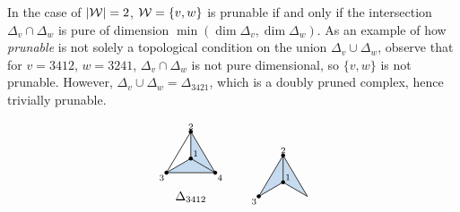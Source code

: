 \begin{example}
In the case of $|\mathcal{W}| = 2$, $\mathcal{W} = \{v,w\}$ is prunable if and only if the intersection $\Delta_v\cap \Delta_w$ is pure of dimension $\min(\dim\Delta_v,\dim\Delta_w)$. As an example of how \emph{prunable} is not solely a topological condition on the union $\Delta_v\cup \Delta_w$, observe that for $v = 3412$, $w=3241$, $\Delta_v\cap\Delta_w$ is not pure dimensional, so $\{v,w\}$ is not prunable. However, $\Delta_v\cup \Delta_w = \Delta_{3421}$, which is a doubly pruned complex, hence trivially prunable.

\[
\begin{tikzpicture}[scale=0.56, x=1cm, y=1cm,
  vtx/.style={circle, fill=black, inner sep=1.15pt},
  ghost/.style={circle, draw=black!30, fill=white, inner sep=1.0pt},
  ed/.style={line width=0.7pt, black!80}]
  \coordinate (v2) at (0.000,1.300);
  \coordinate (v3) at (-1.220,-0.780);
  \coordinate (v4) at (1.220,-0.780);
  \coordinate (v1) at (0.000,-0.060);
  \fill[faceblue] (v1) -- (v2) -- (v4) -- cycle;
  \fill[faceblue] (v1) -- (v3) -- (v4) -- cycle;
  \draw[ed] (v1) -- (v2);
  \draw[ed] (v1) -- (v3);
  \draw[ed] (v1) -- (v4);
  \draw[ed] (v2) -- (v3);
  \draw[ed] (v2) -- (v4);
  \draw[ed] (v3) -- (v4);
  \node[vtx] at (v1) {};
  \node[above right, inner sep=1.6pt, font=\scriptsize] at (v1) {$1$};
  \node[vtx] at (v2) {};
  \node[above, inner sep=1.6pt, font=\scriptsize] at (v2) {$2$};
  \node[vtx] at (v3) {};
  \node[below left, inner sep=1.6pt, font=\scriptsize] at (v3) {$3$};
  \node[vtx] at (v4) {};
  \node[below right, inner sep=1.6pt, font=\scriptsize] at (v4) {$4$};
  \node at (0,-2) {$\Delta_{3412}$};
\end{tikzpicture}
\qquad
\begin{tikzpicture}[scale=0.56, x=1cm, y=1cm,
  vtx/.style={circle, fill=black, inner sep=1.15pt},
  ghost/.style={circle, draw=black!30, fill=white, inner sep=1.0pt},
  ed/.style={line width=0.7pt, black!80}]
  \coordinate (v2) at (0.000,1.300);
  \coordinate (v3) at (-1.220,-0.780);
  \coordinate (v4) at (1.220,-0.780);
  \coordinate (v1) at (0.000,-0.060);
  \fill[faceblue] (v1) -- (v2) -- (v3) -- cycle;
  \fill[faceblue] (v1) -- (v2) -- (v4) -- cycle;
  \draw[ed] (v1) -- (v2);
  \draw[ed] (v1) -- (v3);
  \draw[ed] (v1) -- (v4);
  \draw[ed] (v2) -- (v3);
  \draw[ed] (v2) -- (v4);
  \node[vtx] at (v1) {};
  \node[above right, inner sep=1.6pt, font=\scriptsize] at (v1) {$1$};
  \node[vtx] at (v2) {};
  \node[above, inner sep=1.6pt, font=\scriptsize] at (v2) {$2$};
  \node[vtx] at (v3) {};
  \node[below left, inner sep=1.6pt, font=\scriptsize] at (v3) {$3$};

\end{tikzpicture}\]
\end{example}
